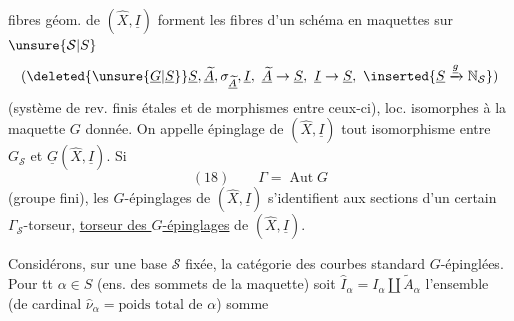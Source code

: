 fibres géom. de $(\widehat X,\underline I)$ forment les fibres d'un schéma en maquettes  sur $\unsure{\mathcal S|S}$
\[
(\deleted{\unsure{\underline G|\underline S}}\underline S,\underline{\widetilde A},\sigma_{\underline{\widetilde A}},\underline I,\ \underline{\widetilde A}\to\underline S,\ \underline I\to\underline S,\ \inserted{\underline S\xrightarrow{\underline g}\mathbb N_{\mathcal S}})
\]
(système de rev. finis étales  et de morphismes entre ceux-ci), loc. isomorphes à la maquette $G$ donnée.  On appelle épinglage de $(\widehat X,\underline I)$ tout isomorphisme entre $G_{\mathcal S}$ et $\underline G(\widehat X,\underline I)$. Si \deleted{$\unsure{\Gamma}$}
\[
(18)\qquad\Gamma=\operatorname{Aut}G
\]
(groupe fini), les $G$-épinglages de $(\widehat X,\underline I)$ s'identifient aux sections d'un certain $\Gamma_{\mathcal S}$-torseur,  \uline{torseur des $G$-épinglages} de $(\widehat X,\underline I)$.

Considérons, sur une base $\mathcal S$ fixée, la catégorie  des courbes standard $G$-épinglées. Pour tt $\alpha\in S$ (ens. des sommets de la maquette) soit $\widehat I_\alpha=I_\alpha\amalg\widetilde A_\alpha$ l'ensemble (de cardinal $\widehat\nu_\alpha=\text{poids total de }\alpha$) somme
